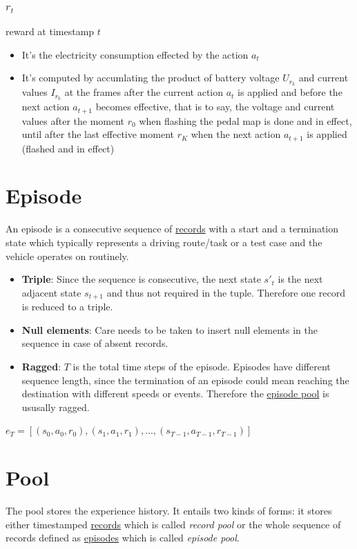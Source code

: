 \documentclass[a4paper, 11pt]{article}
\begin{document}
\subsubsection{\(r_t\)}
\label{sec:org553589c}
reward at timestamp \(t\)
\begin{itemize}
\item It's the electricity consumption effected by the action \(a_t\)
\item It's computed by accumlating the product of battery voltage \(U_{r_k}\) and current values \(I_{r_k}\) at the frames after the current action \(a_t\) is applied and before the next action \(a_{t+1}\) becomes effective, that is to say, the voltage and current values after the moment \(r_0\)  when flashing the pedal map is done and in effect, until after the last effective moment \(r_K\)  when the next action \(a_{t+1}\) is applied (flashed and in effect)
\end{itemize}
\section{Episode}
\label{sec:org22c469d}


An episode is a consecutive sequence of \hyperref[sec:orgf66f1ee]{records} with a start and a termination state which typically represents a driving route/task or a test case and the vehicle operates on routinely.

\begin{itemize}
\item \textbf{Triple}: Since the sequence is consecutive, the next state \(s'_t\) is the next adjacent state \(s_{t+1}\) and thus not required in the tuple. Therefore one record is reduced to a triple.
\item \textbf{Null elements}: Care needs to be taken to insert null elements in the sequence in case of absent records.
\item \textbf{Ragged}: \(T\) is the total time steps of the episode. Episodes have different sequence length, since the termination of an episode could mean reaching the destination with different speeds or events. Therefore the \hyperref[episode_pool]{episode pool} is ususally ragged.
\end{itemize}

\(e_T=[(s_0,a_0,r_0),(s_1,a_1,r_1), ...,(s_{T-1},a_{T-1},r_{T-1})]\)
\section{Pool}
\label{sec:org8b84fe0}
The pool stores the experience history. It entails two kinds of forms: it stores either timestamped \hyperref[sec:orgf66f1ee]{records} which is called \emph{record pool} or the whole sequence of records defined as \hyperref[sec:org22c469d]{episodes} which is called \emph{episode pool}.
\end{document}
